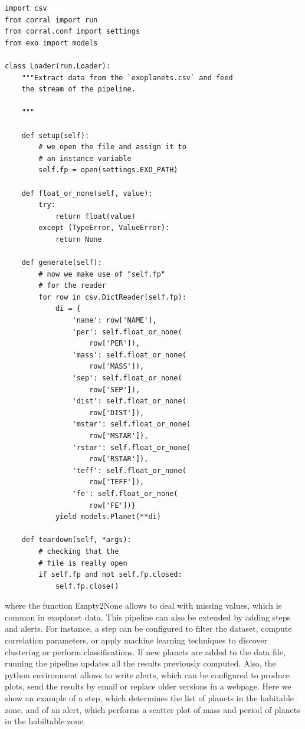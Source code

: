 \documentclass[final,5p,times,twocolumn,authoryear]{elsarticle}
\begin{document}
\begin{verbatim}
import csv
from corral import run
from corral.conf import settings
from exo import models

class Loader(run.Loader):
    """Extract data from the `exoplanets.csv` and feed
    the stream of the pipeline.

    """

    def setup(self):
        # we open the file and assign it to
        # an instance variable
        self.fp = open(settings.EXO_PATH)

    def float_or_none(self, value):
        try:
            return float(value)
        except (TypeError, ValueError):
            return None

    def generate(self):
        # now we make use of "self.fp"
        # for the reader
        for row in csv.DictReader(self.fp):
            di = {
                'name': row['NAME'],
                'per': self.float_or_none(
                    row['PER']),
                'mass': self.float_or_none(
                    row['MASS']),
                'sep': self.float_or_none(
                    row['SEP']),
                'dist': self.float_or_none(
                    row['DIST']),
                'mstar': self.float_or_none(
                    row['MSTAR']),
                'rstar': self.float_or_none(
                    row['RSTAR']),
                'teff': self.float_or_none(
                    row['TEFF']),
                'fe': self.float_or_none(
                    row['FE'])}
            yield models.Planet(**di)

    def teardown(self, *args):
        # checking that the
        # file is really open
        if self.fp and not self.fp.closed:
            self.fp.close()
\end{verbatim}
%
where the function Empty2None allows to deal with missing values, which
is common in exoplanet data.
%
This pipeline can also be extended by adding steps and alerts.
%
For instance, a step can be configured to filter the dataset, compute
correlation parameters, or apply machine learning techniques to
discover clustering or perform classifications.
%
If new planets are added to the data file, running the pipeline
updates all the results previously computed.
%
Also, the python environment allows to write alerts, which
can be configured to produce plots, send the results by
email or replace older versions in a webpage.
%
Here we show an example of a step, which determines the list of planets in the habitable zone, and of an alert, which performs a scatter plot of mass and period of planets in the habiltable zone.
\end{document}
